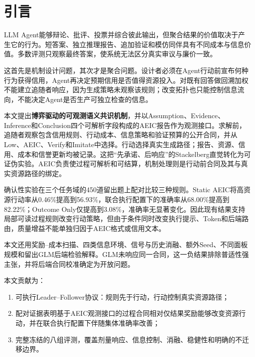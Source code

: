 \section{引言}\label{sec:intro}
LLM Agent能够辩论、批评、投票并综合彼此输出，但聚合结果的价值取决于产生它的行为。短答案、独立推理报告、追加验证和模仿同伴具有不同成本与信息价值。多数评测只观察最终答案，使系统无法区分真实审议与廉价一致。

这首先是机制设计问题，其次才是聚合问题。设计者必须在Agent行动前宣布何种行为获得信用，Agent再决定预期信用是否值得资源投入。对既有回答做回溯加权不能建立追随者响应，因为生成策略未观察该规则；改变拓扑也只能控制信息流向，不能决定Agent是否生产可独立检查的信息。

本文提出\textbf{博弈驱动的可观测语义共识机制}，并以Assumption、Evidence、Inference和Conclusion四个可解析字段构成的AEIC报告作为观测接口。求解前，追随者观察包含信用规则、行动成本、信息策略和验证预算的公开合同，并从Low、AEIC、Verify和Imitate中选择。行动选择真实生成路径；报告、资源、信用、成本和信誉更新均被记录。这把“先承诺、后响应”的Stackelberg直觉转化为可证伪实验。AEIC负责使过程可解析和可结算，机制处理则是行动前合同及其与真实资源路径的绑定。

确认性实验在三个任务域的450道留出题上配对比较三种规则。Static AEIC将高资源行动率从0.46\%提高到56.93\%，联合执行配置下的准确率从68.00\%提高到82.22\%；Outcome Only仅提高到3.08\%，准确率无显著变化。因此现有结果支持局部可读过程规则改变行动策略，但由于条件同时改变执行提示、Token和后端路由，质量增益不能单独归因于AEIC格式或信用文本。

本文还用奖励--成本扫描、四类信息环境、信号与历史消融、额外Seed、不同面板规模和留出GLM后端检验解释。GLM未响应同一合同，这一负结果排除普适性强主张，并将后端合同校准确定为开放问题。

本文贡献为：\begin{enumerate}
\item 可执行Leader--Follower协议：规则先于行动，行动控制真实资源路径；
\item 配对证据表明基于AEIC观测接口的过程合同相对仅结果奖励能够改变资源行动，并在联合执行配置下伴随集体准确率改善；
\item 完整冻结的八组评测，覆盖剂量响应、信息控制、消融、稳健性和明确的不迁移边界。
\end{enumerate}
